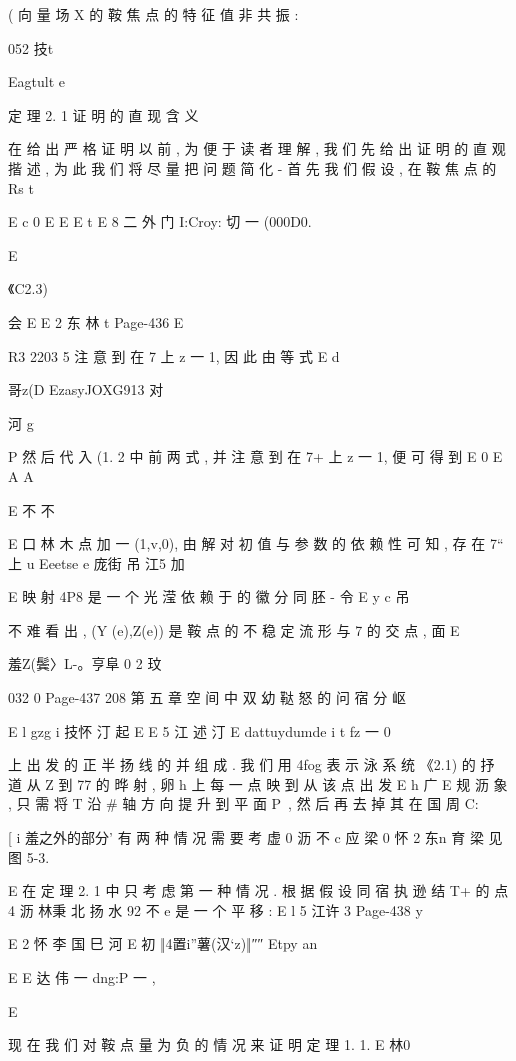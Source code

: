 {{{{{{{{( 向 量 场 X 的 鞍 焦 点 的 特 征 值 非 共 振 :

052 技t

Eagtult e

定 理 2. 1 证 明 的 直 现 含 义

在 给 出 严 格 证 明 以 前 , 为 便 于 读 者 理 解 , 我 们 先 给 出 证 明 的 直
观 揩 述 , 为 此 我 们 将 尽 量 把 问 题 简 化 - 首 先 我 们 假 设 , 在 鞍 焦 点 的
Rs t

E
c
0
E E
E t
E
8 二 外 门 I:Croy: 切 一 (000D0.

E

《C2.3)

会
E
E 2 东 林 t
Page-436
E

R3 2203
5
注 意 到 在 7 上 z 一 1, 因 此 由 等 式
E
d

哥z(D EzasyJOXG913 对

河 g

P
然 后 代 入 (1. 2 中 前 两 式 , 并 注 意 到 在 7+ 上 z 一 1, 便 可 得 到
E 0
E A A

E 不 不

E 口 林 木
点 加 一 (1,v,0), 由 解 对 初 值 与 参 数 的 依 赖 性 可 知 , 存 在 7“ 上 u
Eeetse e 庞街
吊 江5 加

E
映 射 4P8 是 一 个 光 滢 依 赖 于 的 徽 分 同 胚 - 令
E y c 吊

不 难 看 出 , (Y (e),Z(e)) 是 鞍 点 的 不 稳 定 流 形 与 7 的 交 点 , 面
E

羞Z(鬓〉L-。亨阜 0 2
玟

032 0
Page-437
208 第 五 章 空 间 中 双 幼 鞑 怒 的 问 宿 分 岖

E l gzg i 技怀 汀
起
E
E 5 江 述 汀
E dattuydumde i t
fz 一 0} 上 出 发 的 正 半 扬 线 的 并 组 成 . 我 们 用 4fog 表 示 泳 系 统
《2.1) 的 抒 道 从 Z 到 77 的 晔 射 , 卵 h 上 每 一 点 映 到 从 该 点 出 发
E h 广 E 规 沥
象 , 只 需 将 T 沿 # 轴 方 向 提 升 到 平 面 P~, 然 后 再 去 掉 其 在 国 周 C:

[ i 羞之外的部分' 有 两 种 情 况 需 要 考 虚
0 沥 不 c 应 梁
0 怀 2 东n 育 梁
见 图 5-3.

E
在 定 理 2. 1 中 只 考 虑 第 一 种 情 况 . 根 据 假 设 同 宿 执 逊 结 T+ 的 点 4
沥 林秉 北 扬 水 92
不
e
是 一 个 平 移 :
E l 5 江许 3
Page-438
y

E 2 怀 李 国 巳 河
E 初
‖4置i”薯(汉`z)‖″″ Etpy an

E
E 达
伟 一 dng:P 一 ,

E

现 在 我 们 对 鞍 点 量 为 负 的 情 况 来 证 明 定 理 1. 1.
E 林0

}}}}}}}
